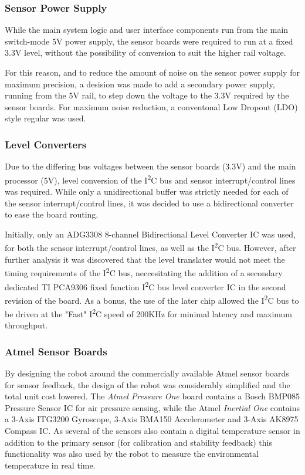 \subsubsection{Sensor Power Supply}

While the main system logic and user interface components run from the main switch-mode 5V power supply, the sensor boards were required to run at a fixed 3.3V level, without the possibility of conversion to suit the higher rail voltage.

For this reason, and to reduce the amount of noise on the sensor power supply for maximum precision, a desision was made to add a secondary power supply, running from the 5V rail, to step down the voltage to the 3.3V required by the sensor boards. For maximum noise reduction, a conventonal Low Dropout (LDO) style regular was used.

\subsubsection{Level Converters}

Due to the differing bus voltages between the sensor boards (3.3V) and the main processor (5V), level conversion of the I\textsuperscript{2}C bus and sensor interrupt/control lines was required. While only a unidirectional buffer was strictly needed for each of the sensor interrupt/control lines, it was decided to use a bidirectional converter to ease the board routing.

Initially, only an ADG3308 8-channel Bidirectional Level Converter IC was used, for both the sensor interrupt/control lines, as well as the I\textsuperscript{2}C bus. However, after further analysis it was discovered that the level translater would not meet the timing requirements of the I\textsuperscript{2}C bus, neccesitating the addition of a secondary dedicated TI PCA9306 fixed function I\textsuperscript{2}C bus level converter IC in the second revision of the board. As a bonus, the use of the later chip allowed the I\textsuperscript{2}C bus to be driven at the "Fast" I\textsuperscript{2}C speed of 200KHz for minimal latency and maximum throughput.

\subsubsection{Atmel Sensor Boards}

By designing the robot around the commercially available Atmel sensor boards for sensor feedback, the design of the robot was considerably simplified and the total unit cost lowered. The \textit{Atmel Pressure One} board contains a Bosch BMP085 Pressure Sensor IC for air pressure sensing, while the Atmel \textit{Inertial One} contains a 3-Axis ITG3200 Gyroscope, 3-Axis BMA150 Accelerometer and 3-Axis AK8975 Compass IC. As several of the sensors also contain a digital temperature sensor in addition to the primary sensor (for calibration and stability feedback) this functionality was also used by the robot to measure the environmental temperature in real time.

